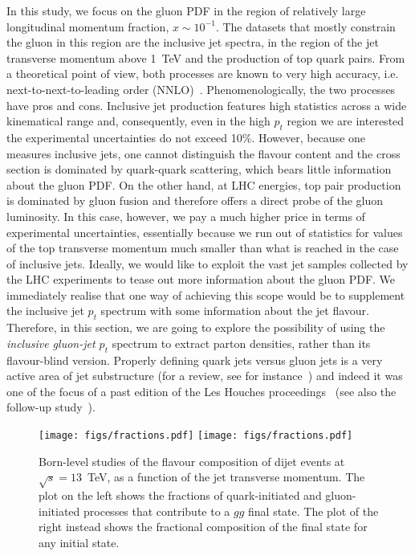 In this study, we focus on the gluon PDF in the region of relatively large longitudinal momentum fraction, $x\sim 10^{-1}$. The datasets that mostly constrain the gluon in this region are the inclusive jet spectra, in the region of the jet transverse momentum above 1~TeV and the production of top quark pairs. From a theoretical point of view, both processes are known to very high accuracy, i.e. next-to-next-to-leading order (NNLO)~\cite{Czakon:2015owf,Currie:2016bfm}. Phenomenologically, the two processes have pros and cons. Inclusive jet production features high statistics across a wide kinematical range and, consequently, even in the high $p_t$ region we are interested the experimental uncertainties do not exceed 10\%. However, because one measures inclusive jets, one cannot distinguish the flavour content and the cross section is dominated by quark-quark scattering, which bears little information about the gluon PDF. 
%
On the other hand, at LHC energies, top pair production is dominated by gluon fusion and therefore offers a direct probe of the gluon luminosity. In this case, however, we pay a much higher price in terms of experimental uncertainties, essentially because we run out of statistics for values of the top transverse momentum much smaller than what is reached in the case of inclusive jets. 
%
Ideally, we would like to exploit the vast jet samples collected by the LHC experiments to tease out more information about the gluon PDF. We immediately realise that one way of achieving this scope would be to supplement the inclusive jet $p_t$ spectrum with some information about the jet flavour. 
%
Therefore, in this section, we are going to explore the possibility of using the \emph{inclusive gluon-jet $p_t$} spectrum to extract parton densities, rather than its flavour-blind version. Properly defining quark jets versus gluon jets is a very active area of jet substructure (for a review, see for instance~\cite{Marzani:2019hun}) and indeed it was one of the focus of a past edition of the Les Houches proceedings~\cite{Badger:2016bpw} (see also the follow-up study~\cite{Gras:2017jty}). 


\begin{figure}
\begin{center}
\texttt{[image: figs/fractions.pdf]} \hfill
\texttt{[image: figs/fractions.pdf]}
\caption{Born-level studies of the flavour composition of dijet events at $\sqrt{s}=13$~TeV, as a function of the jet transverse momentum. The plot on the left shows the fractions of quark-initiated and gluon-initiated processes that contribute to a $gg$ final state. The plot of the right instead shows the fractional composition of the final state for any initial state.}
\label{fig:born_studies} 
\end{center}
\end{figure}

